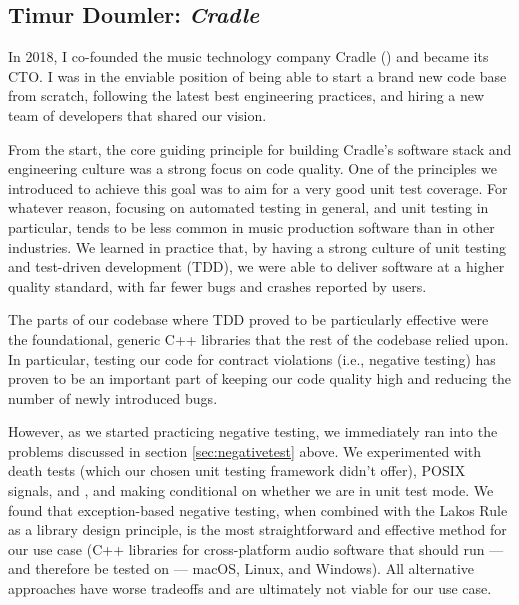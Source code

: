 \subsection{Timur Doumler: \emph{Cradle}}

In 2018, I co-founded the music technology company Cradle (\hyperref[https://cradle.app]{}) and became its CTO. I was in the enviable position of being able to start a brand new code base from scratch, following the latest best engineering practices, and hiring a new team of developers that shared our vision.

From the start, the core guiding principle for building Cradle's software stack and engineering culture was a strong focus on code quality. One of the principles we introduced to achieve this goal was to aim for a very good unit test coverage. For whatever reason, focusing on automated testing in general, and unit testing in particular, tends to be less common in  music production software than in other industries. We learned in practice that, by having a strong culture of unit testing and test-driven development (TDD), we were able to deliver software at a higher quality standard, with far fewer bugs and crashes reported by users.

The parts of our codebase where TDD proved to be particularly effective were the foundational, generic C++ libraries that the rest of the codebase relied upon. In particular, testing our code for contract violations (i.e., negative testing) has proven to be an important part of keeping our code quality high and reducing the number of newly introduced bugs. 

However, as we started practicing negative testing, we immediately ran into the problems discussed in section \ref{sec:negativetest} above. We experimented with death tests (which our chosen unit testing framework didn't offer), POSIX signals,  and , and making  conditional on whether we are in unit test mode. We found that exception-based negative testing, when combined with the Lakos Rule as a library design principle, is the most straightforward and effective method for our use case (C++ libraries for cross-platform audio software that should run --- and therefore be tested on --- macOS, Linux, and Windows). All alternative approaches have worse tradeoffs and are ultimately not viable for our use case.

